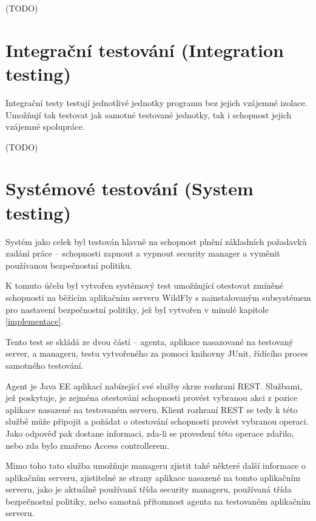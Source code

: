 (TODO)

\section{Integrační testování (Integration testing)}

Integrační testy testují jednotlivé jednotky programu bez jejich vzájemné izolace. Umožňují tak testovat jak samotné testované jednotky, tak i schopnost jejich vzájemné spolupráce.

(TODO)


\section{Systémové testování (System testing)}

Systém jako celek byl testován hlavně na schopnost plnění základních požadavků zadání práce -- schopnosti zapnout a vypnout security manager a vyměnit používanou bezpečnostní politiku.

K tomuto účelu byl vytvořen systémový test umožňující otestovat zmíněné schopnosti na běžícím aplikačním serveru WildFly s nainstalovaným subsystémem pro nastavení bezpečnostní politiky, jež byl vytvořen v minulé kapitole \ref{implementace}.

Tento test se skládá ze dvou částí -- agenta, aplikace nasazované na testovaný server, a manageru, testu vytvořeného za pomoci knihovny JUnit, řídícího proces samotného testování.

Agent je Java EE aplikací nabízející své služby skrze rozhraní REST. Službami, jež poskytuje, je zejména otestování schopnosti provést vybranou akci z pozice aplikace nasazené na testovaném serveru. Klient rozhraní REST se tedy k této službě může připojit a požádat o otestování schopnosti provést vybranou operaci. Jako odpověď pak dostane informaci, zda-li se provedení této operace zdařilo, nebo zda bylo zmařeno Access controllerem.

Mimo toho tato služba umožňuje manageru zjistit také některé další informace o aplikačním serveru, zjistitelné ze strany aplikace nasazené na tomto aplikačním serveru, jako je aktuálně používaná třída security manageru, používaná třída bezpečnostní politiky, nebo samotná přítomnost agenta na testovaném aplikačním serveru.

